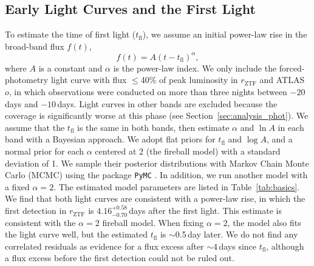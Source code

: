 \documentclass[twocolumn]{aastex631}
\begin{document}
\begin{CJK*}{UTF8}{gbsn}
\subsection{Early Light Curves and the First Light}
To estimate the time of first light ($t_\mathrm{fl}$), we assume an initial power-law rise in the broad-band flux $f(t)$,
$$
f(t) = A (t-t_\mathrm{fl})^\alpha,
$$
where $A$ is a constant and $\alpha$ is the power-law index. We only include the forced-photometry light curve with flux $\le$40\% of peak luminosity \citep{Miller_ZTF_2020} in $r_\mathrm{ZTF}$ and ATLAS $o$, in which observations were conducted on more than three nights between $-20$\,days and $-10$\,days. Light curves in other bands are excluded because the coverage is significantly worse at this phase (see Section~\ref{sec:analysis_phot}). We assume that the $t_\mathrm{fl}$ is the same in both bands, then estimate $\alpha$ and $\ln A$ in each band with a Bayesian approach. We adopt flat priors for $t_\mathrm{fl}$ and $\log A$, and a normal prior for each $\alpha$ centered at 2 (the fireball model) with a standard deviation of 1. We sample their posterior distributions with Markov Chain Monte Carlo (MCMC) using the package \texttt{PyMC} \citep{pymc_2016}. In addition, we run another model with a fixed $\alpha=2$. The estimated model parameters are listed in Table~\ref{tab:basics}. We find that both light curves are consistent with a power-law rise, in which the first detection in $r_\mathrm{ZTF}$ is $4.16^{+0.58}_{-0.70}$\,days after the first light. This estimate is consistent with the $\alpha=2$ fireball model. When fixing $\alpha=2$, the model also fits the light curve well, but the estimated $t_\mathrm{fl}$ is $\sim$0.5\,day later. We do not find any correlated residuals as evidence for a flux excess after $\sim$4\,days since $t_\mathrm{fl}$, although a flux excess before the first detection could not be ruled out.



\end{CJK*}
\end{document}
